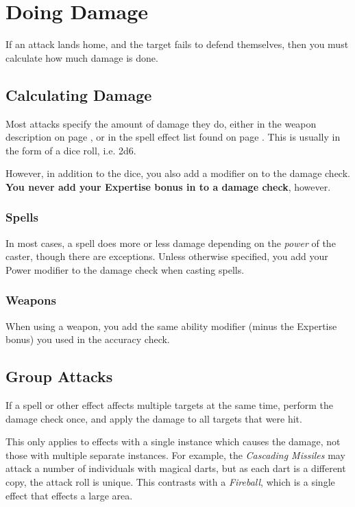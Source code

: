 \section{Doing Damage} \label{S:Damage}

If an attack lands home, and the target fails to defend themselves, then you must calculate how much damage is done.

\subsection{Calculating Damage}

Most attacks specify the amount of damage they do, either in the weapon description on page \pageref{S:WeaponList}, or in the spell effect list found on page \pageref{S:SpellList}. This is usually in the form of a dice roll, i.e. 2d6.

However, in addition to the dice, you also add a modifier on to the damage check. {\bf You never add your Expertise bonus in to a damage check}, however. 

\subsubsection{Spells}

In most cases, a spell does more or less damage depending on the {\it power} of the caster, though there are exceptions. Unless otherwise specified, you add your Power modifier to the damage check when casting spells. 

\subsubsection{Weapons}

When using a weapon, you add the same ability modifier (minus the Expertise bonus) you used in the accuracy check. 

\subsection{Group Attacks}

If a spell or other effect affects multiple targets at the same time, perform the damage check once, and apply the damage to all targets that were hit. 

This only applies to effects with a single instance which causes the damage, not those with multiple separate instances. For example, the {\it Cascading Missiles} may attack a number of individuals with magical darts, but as each dart is a different copy, the attack roll is unique. This contrasts with a {\it Fireball}, which is a single effect that effects a large area. 

